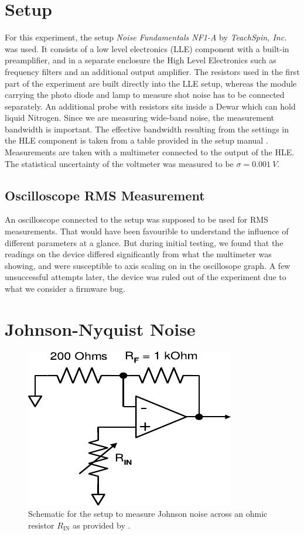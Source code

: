 \documentclass[
    parskip=half, 
    twoside=false,
    twocolumn=true,
    fontsize=11pt,
]{scrarticle}
\begin{document}
\section{Setup}
For this experiment, the setup \textit{Noise Fundamentals NF1-A} by \textit{TeachSpin, Inc.} was used. It consists of a low level electronics (LLE) component with a built-in preamplifier, and in a separate enclosure the High Level Electronics such as frequency filters and an additional output amplifier. The resistors used in the first part of the experiment are built directly into the LLE setup, whereas the module carrying the photo diode and lamp to measure shot noise has to be connected separately. An additional probe with resistors sits inside a Dewar which can hold liquid Nitrogen. Since we are measuring wide-band noise, the measurement bandwidth is important. The effective bandwidth resulting from the settings in the HLE component is taken from a table provided in the setup manual \autocite{instructions}.\\
Measurements are taken with a multimeter connected to the output of the HLE. The statistical uncertainty of the voltmeter was measured to be $\sigma = \SI{0.001}{V}$.

\subsection*{Oscilloscope RMS Measurement}
An oscilloscope connected to the setup was supposed to be used for RMS measurements. That would have been favourible to understand the influence of different parameters at a glance. But during initial testing, we found that the readings on the device differed significantly from what the multimeter was showing, and were susceptible to axis scaling on in the oscillosope graph. A few unsuccessful attempts later, the device was ruled out of the experiment due to what we consider a firmware bug.\\

\section{Johnson-Nyquist Noise}

\begin{figure}[h!]
    \centering
    \includegraphics{figures/measure_R_setup_part1.pdf}
    \caption{
        Schematic for the setup to measure Johnson noise across an ohmic resistor $R_\text{IN}$ as provided by \autocite{instructions}.
    }
    \label{fig:johnson setup R}
\end{figure}
\end{document}
